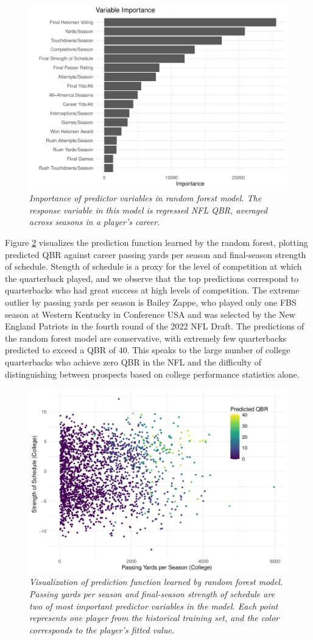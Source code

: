 \documentclass[Review, sageh, times]{sagej}
\begin{document}
\begin{figure}[h]
    \centering
    \includegraphics[width=0.7\linewidth]{variable_importance.pdf}
    \caption{\it Importance of predictor variables in random forest model. The response variable in this model is regressed NFL QBR, averaged across seasons in a player's career.}
    \label{fig:importance}
\end{figure}

Figure \ref{fig:3d-plot} visualizes the prediction function learned by the random forest, plotting predicted QBR against career passing yards per season and final-season strength of schedule. Stength of schedule is a proxy for the level of competition at which the quarterback played, and we observe that the top predictions correspond to quarterbacks who had great success at high levels of competition. The extreme outlier by passing yards per season is Bailey Zappe, who played only one FBS season at Western Kentucky in Conference USA and was selected by the New England Patriots in the fourth round of the 2022 NFL Draft. The predictions of the random forest model are conservative, with extremely few quarterbacks predicted to exceed a QBR of 40. This speaks to the large number of college quarterbacks who achieve zero QBR in the NFL and the difficulty of distinguishing between prospects based on college performance statistics alone.

\begin{figure}[h]
    \centering
    \includegraphics[width=0.7\linewidth]{3d_plot.pdf}
    \caption{\it Visualization of prediction function learned by random forest model. Passing yards per season and final-season strength of schedule are two of most important predictor variables in the model. Each point represents one player from the historical training set, and the color corresponds to the player's fitted value.}
    \label{fig:3d-plot}
\end{figure}
\end{document}
